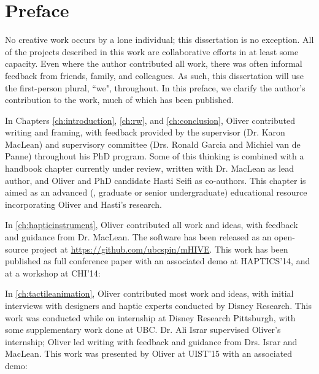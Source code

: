 
\chapter{Preface}
No creative work occurs by a lone individual; this dissertation is no exception.
All of the projects described in this work are collaborative efforts in at least some capacity.
Even where the author contributed all work, there was often informal feedback from friends, family, and colleagues.
As such, this dissertation will use the first-person plural, ``we", throughout.
In this preface, we clarify the author's contribution to the work, much of which has been published.

In Chapters \ref{ch:introduction}, \ref{ch:rw}, and \ref{ch:conclusion}, Oliver contributed writing and framing, with feedback provided by the supervisor (Dr. Karon MacLean) and supervisory committee (Drs. Ronald Garcia and Michiel van de Panne) throughout his PhD program. 
Some of this thinking  is combined with a handbook chapter currently under review, written with Dr. MacLean as lead author, and Oliver and PhD candidate Hasti Seifi as co-authors.
This chapter is aimed as an advanced (\ie, graduate or senior undergraduate) educational resource incorporating Oliver and Hasti's research.

In \autoref{ch:hapticinstrument}, Oliver contributed all work and ideas, with feedback and guidance from Dr. MacLean.
The software has been released as an open-source project at \url{https://github.com/ubcspin/mHIVE}.
This work has been published as full conference paper with an associated demo at HAPTICS'14, and at a workshop at CHI'14:


\noindent
In \autoref{ch:tactileanimation}, Oliver contributed most work and ideas, with initial interviews with designers and haptic experts conducted by Disney Research.
This work was conducted while on internship at Disney Research Pittsburgh, with some supplementary work done at UBC.
Dr. Ali Israr supervised Oliver's internship; Oliver led writing with feedback and guidance from Drs. Israr and MacLean.
This work was presented by Oliver at UIST'15 with an associated demo:

